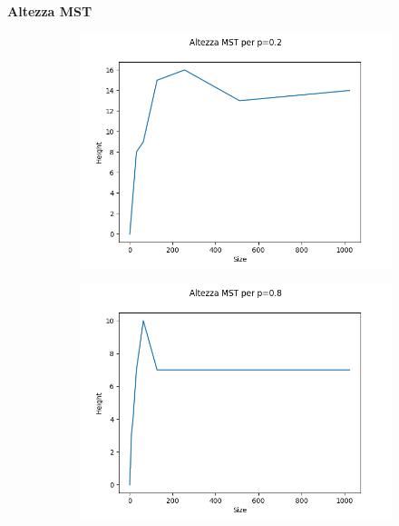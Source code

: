 \documentclass[]{article}
\begin{document}
\textbf{Altezza MST}\\
\begin{figure}[H]
    \centering
    \begin{subfigure}[b]{0.45\linewidth} 
        \centering
        \includegraphics[width=\textwidth]{krusk_height_p=02}
        \label{fig:quick_casuale}
    \end{subfigure}
    \quad
    \begin{subfigure}[b]{0.45\linewidth}
        \centering
        \includegraphics[width=\textwidth]{krusk_height_p=08}
        \label{fig:quick_best}
    \end{subfigure}
\end{figure}
\end{document}
